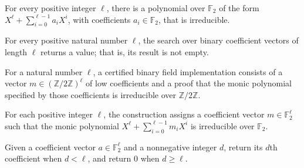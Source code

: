 \begin{theorem}
\label{FABL.exists_irreducible_binaryMonicPolynomial}
\leanok
{}
For every positive integer $\ell$, there is a polynomial over $\mathbb{F}_2$ of the
form $X^\ell+\sum_{i=0}^{\ell-1}a_iX^i$, with coefficients $a_i\in\mathbb{F}_2$,
that is irreducible.
\end{theorem}

\begin{theorem}
\leanok
{}
For every positive natural number $\ell$, the search over binary coefficient vectors of
length $\ell$ returns a value; that is, its result is not empty.
\end{theorem}

\begin{definition}
\label{FABL.CertifiedBinaryFieldImplementation}
\leanok
{}
For a natural number $\ell$, a certified binary field implementation consists of a
vector $m\in(\mathbb{Z}/2\mathbb{Z})^\ell$ of low coefficients and a proof that the
monic polynomial specified by those coefficients is irreducible over
$\mathbb{Z}/2\mathbb{Z}$.
\end{definition}

\begin{definition}
\label{FABL.buildCertifiedBinaryFieldImplementation}
\leanok
{}
For each positive integer $\ell$, the construction assigns a coefficient vector
$m\in\mathbb{F}_2^\ell$ such that the monic polynomial
$X^\ell+\sum_{i=0}^{\ell-1}m_iX^i$ is irreducible over $\mathbb{F}_2$.
\end{definition}

\begin{definition}
\label{FABL.binaryCoefficientAt}
\leanok
{}
Given a coefficient vector $a\in\mathbb{F}_2^\ell$ and a nonnegative integer $d$, return
its $d$th coefficient when $d<\ell$, and return $0$ when $d\ge\ell$.
\end{definition}

